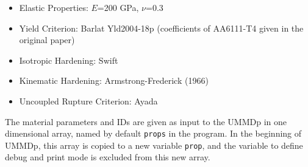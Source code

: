 \documentclass[11pt,a4paper,twoside,final,onecolumn,titlepage]{article}
\begin{document}
\begin{itemize}
	\item Elastic Properties: $E$=200 GPa, $\nu$=0.3
	\item Yield Criterion: Barlat Yld2004-18p (coefficients of AA6111-T4 given in the original paper)
	\item Isotropic Hardening: Swift
	\item Kinematic Hardening: Armstrong-Frederick (1966)
	\item Uncoupled Rupture Criterion: Ayada
\end{itemize}

\noindent The material parameters and IDs are given as input to the UMMDp in one dimensional array, named by default \texttt{props} in the program. In the beginning of UMMDp, this array is copied to a new variable \texttt{prop}, and the variable to define debug and print mode is excluded from this new array.
\end{document}
